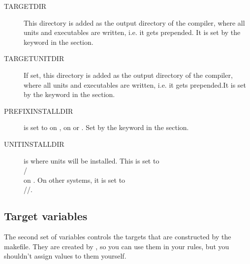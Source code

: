 \begin{description}
\item[TARGETDIR] This directory is added as the output directory of
the compiler, where all units and executables are written, i.e. it gets
 prepended. It is set by the  keyword in the
 section.

\item[TARGETUNITDIR] If set, this directory is added as the output directory of
the compiler, where all units and executables are written, i.e. it gets
 prepended.It is set by the  keyword in the
 section.

\item[PREFIXINSTALLDIR] is set to  on \linux,  on \dos
or \windowsnt. Set by the  keyword in the 
section.

\item[UNITINSTALLDIR] is where units will be installed. This is set to\\
/ \\
on \linux. On other systems, it is set to \\
//.
\end{description}

\subsection{Target variables}

The second set of variables controls the targets that are constructed
by the makefile. They are created by , so you can use
them in your rules, but you shouldn't assign values to them yourself.

